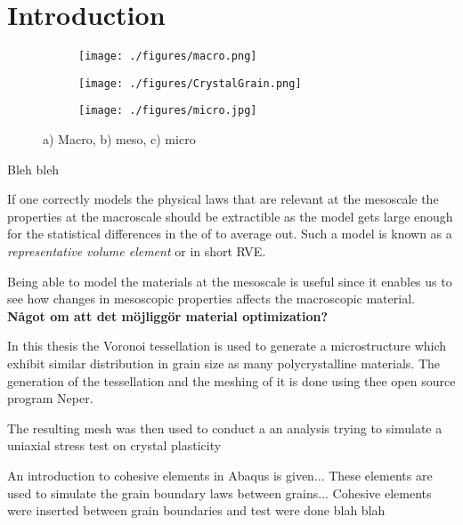 \documentclass[introduction.tex]{subfiles}
\begin{document}
\chapter{Introduction}



 \begin{figure}
\centering

\begin{subfigure}{.1\textwidth}
  \centering
  \texttt{[image: ./figures/macro.png]}
  \caption{}
  \label{fig:macro}
\end{subfigure}
\scalebox{1.5}{$\boldsymbol{\longrightarrow}$}
\begin{subfigure}{.33\textwidth}
  \centering
  \texttt{[image: ./figures/CrystalGrain.png]}
  \caption{}
  \label{fig:meso}
\end{subfigure}%
\scalebox{1.5}{$\boldsymbol{\longrightarrow}$}
\begin{subfigure}{.33\textwidth}
  \centering
  \texttt{[image: ./figures/micro.jpg]}
  \caption{}
  \label{fig:micro}
\end{subfigure}
\caption{a) Macro, b) meso, c) micro \cite{Ozawa:ko5009}}
\label{micmacmes}
\end{figure}



Bleh bleh



If one correctly models the physical laws that are relevant at the mesoscale the properties at the macroscale should be extractible as the model gets large enough for the statistical differences in the  of  to average out.  Such a model is known as a \textit{representative volume element} or in short RVE.

Being able to model the materials at the mesoscale is useful since it enables us to see how changes in mesoscopic properties affects the macroscopic material. \textbf{Något om att det möjliggör material optimization?}



In this thesis the Voronoi tessellation is used to generate a microstructure which exhibit similar distribution in grain size as many polycrystalline materials. The generation of the tessellation and the meshing of it is done using thee open source program Neper.

The resulting mesh was then used to conduct a an analysis trying to simulate a uniaxial stress test on crystal plasticity

An introduction to cohesive elements in Abaqus is given... These elements are used to simulate the grain boundary laws between grains...
Cohesive elements were inserted between grain boundaries and test were done blah blah
\end{document}
